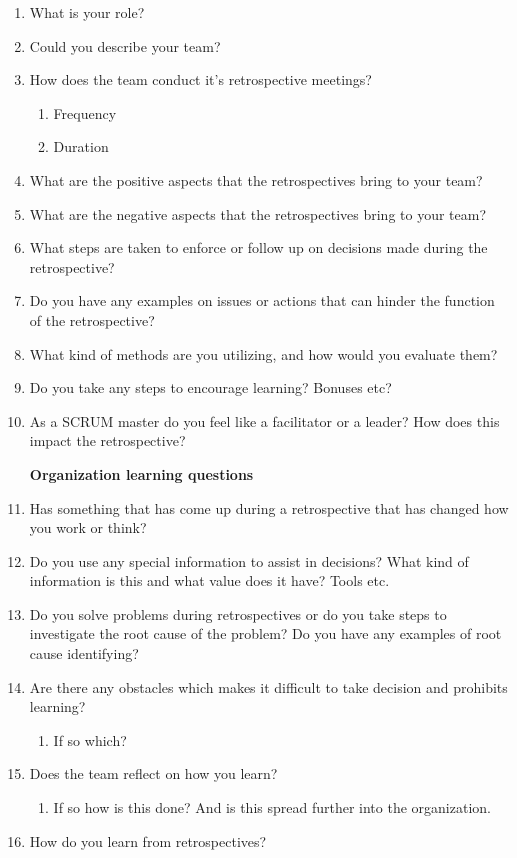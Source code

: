 \begin{enumerate}
\item What is your role?
\item Could you describe your team?
\item How does the team conduct it’s retrospective meetings?
\begin{enumerate}
	\item Frequency
	\item Duration
\end{enumerate}
\item What are the positive aspects that the retrospectives bring to your team?
\item What are the negative aspects that the retrospectives bring to your team?
\item What steps are taken to enforce or follow up on decisions made during the retrospective?
\item Do you have any examples on issues or actions that can hinder the function of the retrospective?
\item What kind of methods are you utilizing, and how would you evaluate them?
\item Do you take any steps to encourage learning? Bonuses etc?
\item As a SCRUM master do you feel like a facilitator or a leader? How does this impact the retrospective?\\

\begin{center} 
	\textbf{Organization learning questions}
\end{center}
\item Has something that has come up during a retrospective that has changed how you work or think?
\item Do you use any special information to assist in decisions? What kind of information is this and what value does it have? Tools etc.
\item Do you solve problems during retrospectives or do you take steps to investigate the root cause of the problem? Do you have any examples of root cause identifying?
\item Are there any obstacles which makes it difficult to take decision and prohibits learning?
\begin{enumerate}
	\item If so which?
\end{enumerate}
\item Does the team reflect on how you learn?
\begin{enumerate}
	\item If so how is this done? And is this spread further into the organization.
\end{enumerate}
\item How do you learn from retrospectives?\\


\end{enumerate}

